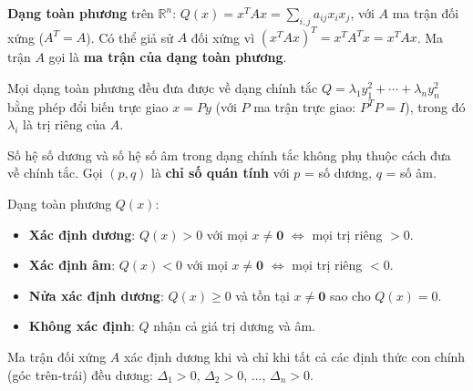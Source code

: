 \documentclass[12pt,a4paper]{article}
\begin{document}
\begin{dinhnghia}
  \textbf{Dạng toàn phương} trên $\mathbb{R}^n$: $Q(x) = x^T A x = \sum_{i,j} a_{ij} x_i x_j$, với $A$ ma trận đối xứng ($A^T = A$). Có thể giả sử $A$ đối xứng vì $(x^T A x)^T = x^T A^T x = x^T A x$. Ma trận $A$ gọi là \textbf{ma trận của dạng toàn phương}.
\end{dinhnghia}

\begin{dinhly}[title={Dạng chính tắc}]
  Mọi dạng toàn phương đều đưa được về dạng chính tắc $Q = \lambda_1 y_1^2 + \cdots + \lambda_n y_n^2$ bằng phép đổi biến trực giao $x = Py$ (với $P$ ma trận trực giao: $P^T P = I$), trong đó $\lambda_i$ là trị riêng của $A$.
\end{dinhly}

\begin{dinhly}[title={Luật quán tính Sylvester}]
  Số hệ số dương và số hệ số âm trong dạng chính tắc không phụ thuộc cách đưa về chính tắc. Gọi $(p, q)$ là \textbf{chỉ số quán tính} với $p$ = số dương, $q$ = số âm.
\end{dinhly}

\begin{dinhnghia}[title={Xác định dấu}]
  Dạng toàn phương $Q(x)$:
  \begin{itemize}
    \item \textbf{Xác định dương}: $Q(x) > 0$ với mọi $x \ne \mathbf{0}$ $\Leftrightarrow$ mọi trị riêng $> 0$.
    \item \textbf{Xác định âm}: $Q(x) < 0$ với mọi $x \ne \mathbf{0}$ $\Leftrightarrow$ mọi trị riêng $< 0$.
    \item \textbf{Nửa xác định dương}: $Q(x) \ge 0$ và tồn tại $x \ne \mathbf{0}$ sao cho $Q(x) = 0$.
    \item \textbf{Không xác định}: $Q$ nhận cả giá trị dương và âm.
  \end{itemize}
\end{dinhnghia}

\begin{phuongphap}[title={Tiêu chuẩn Sylvester}]
  Ma trận đối xứng $A$ xác định dương khi và chỉ khi tất cả các định thức con chính (góc trên-trái) đều dương: $\Delta_1 > 0$, $\Delta_2 > 0$, $\ldots$, $\Delta_n > 0$.
\end{phuongphap}
\end{document}
